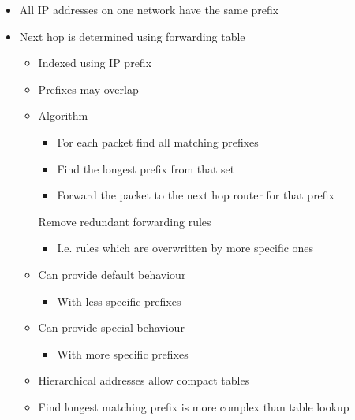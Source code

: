 \begin{itemize}
\begin{itemize}
            \item All IP addresses on one network have the same prefix
            \item Next hop is determined using forwarding table
                \begin{itemize}
                    \item Indexed using IP prefix
                    \item Prefixes may overlap
                \end{itemize}
                \begin{itemize}
                    \item Algorithm
                        \begin{itemize}
                            \item For each packet find all matching prefixes
                            \item Find the longest prefix from that set
                            \item Forward the packet to the next hop router for that prefix
                        \end{itemize}
                     Remove redundant forwarding rules
                        \begin{itemize}
                            \item I.e. rules which are overwritten by more specific ones
                        \end{itemize}
                    \item Can provide default behaviour
                        \begin{itemize}
                            \item With less specific prefixes
                        \end{itemize}
                    \item Can provide special behaviour
                        \begin{itemize}
                            \item With more specific prefixes
                        \end{itemize}
                    \item Hierarchical addresses allow compact tables
                    \item Find longest matching prefix is more complex than table lookup
                \end{itemize}

\end{itemize}
\end{itemize}
